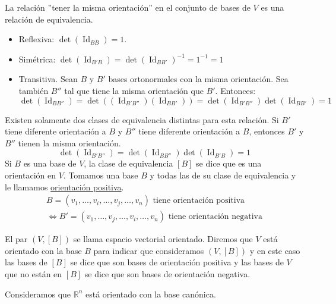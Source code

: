\documentclass[12pt, a4paper, ones, notitlepage, openany,titlepage]{article}
\begin{document}
La relación ''tener la misma orientación'' en el conjunto de bases de $V$ es una relación de equivalencia.
\begin{itemize}
	\item Reflexiva: $\det(\operatorname{Id}_{BB}) = 1$.
	\item Simétrica: $\det(\operatorname{Id}_{B'B}) = \det(\operatorname{Id}_{BB'})^{-1} = 1^{-1} = 1$
	\item Transitiva. Sean $B$ y $B'$ bases ortonormales con la misma orientación. Sea también $B''$ tal que tiene la misma orientación que $B'$. Entonces:
	$$
	\det(\operatorname{Id}_{BB''}) = \det((\operatorname{Id}_{B'B''})(\operatorname{Id}_{BB'})) = \det(\operatorname{Id}_{B'B''})\det(\operatorname{Id}_{BB'}) = 1
	$$ 
\end{itemize}
\noindent Existen solamente dos clases de equivalencia distintas para esta relación. Si $B'$ tiene diferente orientación a $B$ y $B''$ tiene diferente orientación a $B$, entonces $B'$ y $B''$ tienen la misma orientación.
$$
\det(\operatorname{Id}_{B'B''}) = \det(\operatorname{Id}_{BB''})\det(\operatorname{Id}_{B'B}) = 1
$$
Si $B$ es una base de $V$, la clase de equivalencia $[B]$ se dice que es una orientación en $V$. Tomamos una base $B$ y todas las de su clase de equivalencia y le llamamos \underline{orientación positiva}.
\begin{gather*}
	B = (v_1,\ldots,v_i,\ldots,v_j,\ldots,v_n) \text{ tiene orientación positiva} \\
	\Longleftrightarrow B' = (v_1,\ldots,v_j,\ldots,v_i,\ldots,v_n) \text{ tiene orientación negativa}
\end{gather*}

El par $(V,[B])$ se llama espacio vectorial orientado. Diremos que $V$ está orientado con la base $B$ para indicar que consideramos $(V,[B])$ y en este caso las bases de $[B]$ se dice que son bases de orientación positiva y las bases de $V$ que no están en $[B]$ se dice que son bases de orientación negativa.

Consideramos que $\mathbb{R}^{n}$ está orientado con la base canónica.
\end{document}
